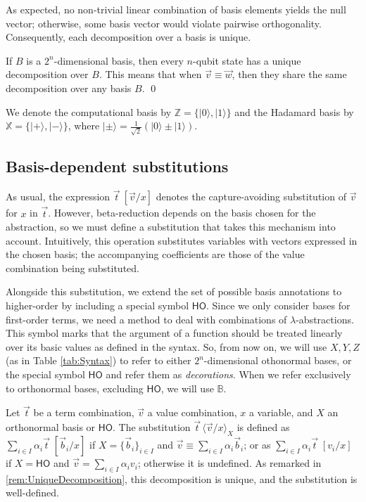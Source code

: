 \documentclass[a4paper,UKenglish,numberwithinsect,pdfa,anonymous]{lipics-v2021}
\theoremstyle{restatestyle}
\newcommand\ket[1]{\ensuremath{|#1\rangle}}
\newcommand\ansubst[2]{\ensuremath{\langle #1 \rangle_{#2}}}
\newcommand\AbsBasis{\ensuremath{\mathsf{H\!O}}}
\def\BB{\mathbb{B}}
\newcommand\B{\mathbb Z}
\newcommand\XB{\mathbb X}
\begin{document}
As expected, no non-trivial linear combination of basis elements yields the null vector;
otherwise, some basis vector would violate pairwise orthogonality. Consequently, each
decomposition over a basis is unique.

\begin{remark}\label{rem:UniqueDecomposition}\label{cor:EquivalentDecomposition}
  If $B$ is a $2^n$-dimensional basis, then every $n$-qubit state has a
  unique decomposition over $B$. This means that when $\vec{v} \equiv \vec{w}$,
  then they share the same decomposition over any basis $B$.
  \qed
\end{remark}

We denote the computational basis by $\B=\{\ket{0},\ket{1}\}$ and the Hadamard
basis by $\XB=\{\ket{+},\ket{-}\}$, where
$\ket{\pm}=\tfrac{1}{\sqrt{2}}(\ket{0}\pm\ket{1})$.  

\subsection{Basis-dependent substitutions}
As usual, the expression $\vec t\ [\vec v/x]$ denotes the
capture-avoiding substitution of $\vec v$ for $x$ in $\vec t$.
However, beta-reduction depends on the basis chosen for the abstraction, so we must
define a substitution that takes this mechanism into account. Intuitively, this
operation substitutes variables with vectors expressed in the chosen basis; the
accompanying coefficients are those of the value combination being
substituted.

Alongside this substitution, we extend the set of possible basis annotations to
higher-order by including a special symbol \AbsBasis. Since we only consider bases
for first-order terms, we need a method to deal with combinations of 
$\lambda$-abstractions. This symbol marks that the argument of a function should be
treated linearly over its basic values as defined in the syntax. So, from now on, 
we will use $X, Y, Z$ (as in Table \ref{tab:Syntax}) to refer to either
$2^n$-dimensional othonormal bases, or the special symbol $\AbsBasis$ and
refer them as \emph{decorations}. When we refer exclusively to orthonormal bases,
excluding $\AbsBasis$, we will use $\BB$.

\begin{definition}\label{def:basisDependentSub}
  Let $\vec t$ be a term combination, $\vec v$ a value combination, $x$ a
  variable, and $X$ an orthonormal basis or $\AbsBasis$. The substitution 
  $\vec t\,\ansubst{\vec v/x}{X}$ is defined as $\sum_{i\in I}\alpha_i
  \vec{t}\;[\vec{b}_i/x]$ if $X=\{\vec{b}_i\}_{i\in I}$ and $\vec{v}\equiv
  \sum_{i\in I} \alpha_i\vec{b}_i$; or as $\sum_{i\in I}\alpha_i\vec{t}\;[v_i/x]$
  if $X=\AbsBasis$ and $\vec{v}=\sum_{i\in I} \alpha_i v_i$; otherwise it is
  undefined. As remarked in \ref{rem:UniqueDecomposition}, this decomposition
  is unique, and the substitution is well-defined.
\end{definition}
\end{document}
